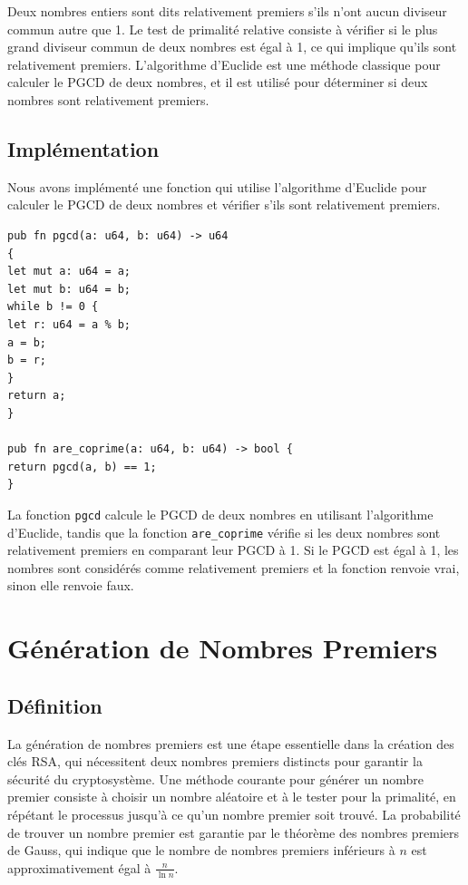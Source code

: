 \documentclass[11pt]{article}
\begin{document}
Deux nombres entiers sont dits relativement premiers s'ils n'ont aucun diviseur commun autre que 1.
Le test de primalité relative consiste à vérifier si le plus grand diviseur commun de deux nombres est égal à 1, ce qui implique qu'ils sont relativement premiers.
L'algorithme d'Euclide est une méthode classique pour calculer le PGCD de deux nombres, et il est utilisé pour déterminer si deux nombres sont relativement premiers.

\subsection{Implémentation}\label{subsec:implementation}

Nous avons implémenté une fonction qui utilise l'algorithme d'Euclide pour calculer le PGCD de deux nombres et vérifier s'ils sont relativement premiers.

\lstset{language=Rust}
\begin{lstlisting}[caption={Fonction de test de primalité relative (Rust)}, label={lst:rust_exponential_fast_mod}]
pub fn pgcd(a: u64, b: u64) -> u64
{
let mut a: u64 = a;
let mut b: u64 = b;
while b != 0 {
let r: u64 = a % b;
a = b;
b = r;
}
return a;
}

pub fn are_coprime(a: u64, b: u64) -> bool {
return pgcd(a, b) == 1;
}
\end{lstlisting}

La fonction \texttt{pgcd} calcule le PGCD de deux nombres en utilisant l'algorithme d'Euclide, tandis que la fonction \texttt{are\_coprime} vérifie si les deux nombres sont relativement premiers en comparant leur PGCD à 1.
Si le PGCD est égal à 1, les nombres sont considérés comme relativement premiers et la fonction renvoie vrai, sinon elle renvoie faux.


\section{Génération de Nombres Premiers}\label{sec:generation-de-nombres-premiers}

\subsection{Définition}\label{subsec:definition}

La génération de nombres premiers est une étape essentielle dans la création des clés RSA, qui nécessitent deux nombres premiers distincts pour garantir la sécurité du cryptosystème.
Une méthode courante pour générer un nombre premier consiste à choisir un nombre aléatoire et à le tester pour la primalité, en répétant le processus jusqu'à ce qu'un nombre premier soit trouvé.
La probabilité de trouver un nombre premier est garantie par le théorème des nombres premiers de Gauss, qui indique que le nombre de nombres premiers inférieurs à $n$ est approximativement égal à $\frac{n}{\ln n}$.
\end{document}
